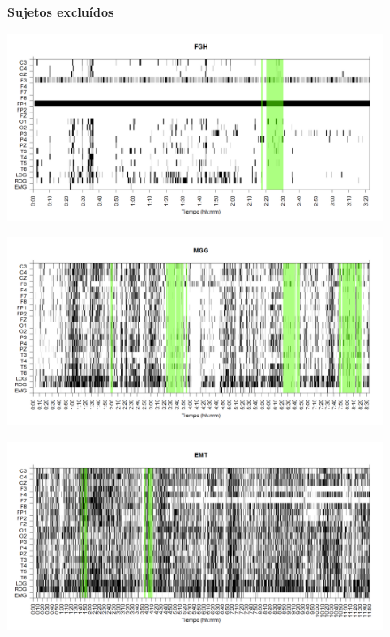 \documentclass[12pt,a4paper]{mitthesis}
\begin{document}
\begin{figure}
\Large{\textbf{Sujetos exclu\'idos}}
\end{figure}

\begin{figure}
\centering
\includegraphics[width=0.8\linewidth]
{./g170413/FGHSUE_est.png} 
\label{grf_FGH}
\end{figure}

\begin{figure}
\centering
\includegraphics[width=0.8\linewidth]
{./g170413/MGNA5SUE_est.png} 
\label{grf_MGG}
\end{figure}

\begin{figure}
\centering
\includegraphics[width=0.8\linewidth]
{./g170413/EMNNS_est.png} 
\label{grf_EMT}
\end{figure}

\end{document}
